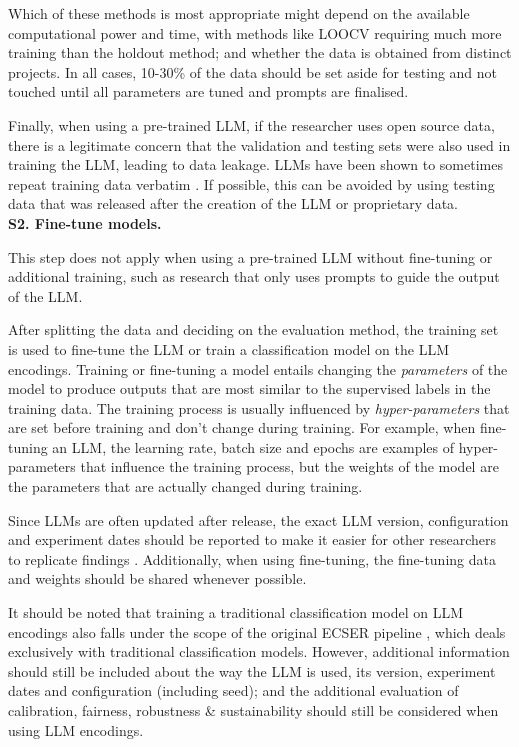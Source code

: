 \documentclass[a4paper]{article}
\newcommand{\infobox}[2]{
	\begin{tcolorbox}[
		skin=widget,
		boxrule=1mm,
		coltitle=black,
		colframe=darkishgray,
		colback=lightergray,
		width=(\linewidth),
		before=\hfill,
		after=\hfill,
		before skip=1pt,
		adjusted title={#1}
		]
		#2
	\end{tcolorbox}
}
\begin{document}
Which of these methods is most appropriate might depend on the available computational power and time, with methods like LOOCV requiring much more training than the holdout method; and whether the data is obtained from distinct projects. In all cases, 10-30\% of the data should be set aside for testing and not touched until all parameters are tuned and prompts are finalised.

Finally, when using a pre-trained LLM, if the researcher uses open source data, there is a legitimate concern that the validation and testing sets were also used in training the LLM, leading to data leakage. LLMs have been shown to sometimes repeat training data verbatim  \cite{carlini2021extractingtrainingdatalarge}. If possible, this can be avoided by using testing data that was released after the creation of the LLM or proprietary data. \\

\textbf{S2. Fine-tune models.} \\ 
\infobox{Optional}{This step does not apply when using a pre-trained LLM without fine-tuning or additional training, such as research that only uses prompts to guide the output of the LLM.}
After splitting the data and deciding on the evaluation method, the training set is used to fine-tune the LLM or train a classification model on the LLM encodings. Training or fine-tuning a model entails changing the \textit{parameters} of the model to produce outputs that are most similar to the supervised labels in the training data. The training process is usually influenced by \textit{hyper-parameters} that are set before training and don't change during training. For example, when fine-tuning an LLM, the learning rate, batch size and epochs are examples of hyper-parameters that influence the training process, but the weights of the model are the parameters that are actually changed during training. 

Since LLMs are often updated after release, the exact LLM version, configuration and experiment dates should be reported to make it easier for other researchers to replicate findings \cite{baltes2025guidelinesempiricalstudiessoftware}. Additionally, when using fine-tuning, the fine-tuning data and weights should be shared whenever possible.

It should be noted that training a traditional classification model on LLM encodings also falls under the scope of the original ECSER pipeline \cite{Dellanna2022}, which deals exclusively with traditional classification models. However, additional information should still be included about the way the LLM is used, its version, experiment dates and configuration (including seed); and the additional evaluation of calibration, fairness, robustness \& sustainability should still be considered when using LLM encodings.
\end{document}

